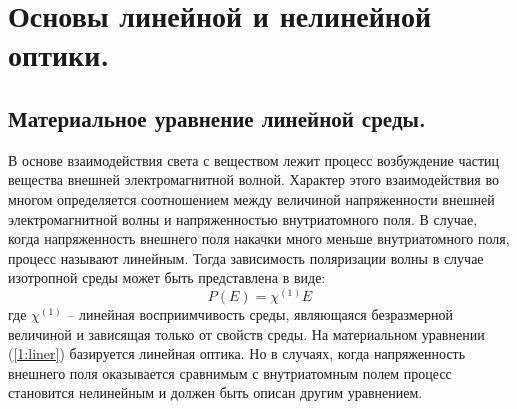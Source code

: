 \section{Основы линейной и нелинейной оптики.}

\subsection{Материальное уравнение линейной среды.}
\hspace*{2mm}
В основе взаимодействия света с веществом лежит процесс возбуждение частиц вещества внешней электромагнитной волной. Характер этого взаимодействия во многом определяется соотношением между величиной напряженности внешней электромагнитной волны и напряженностью внутриатомного поля. В случае, когда напряженность внешнего поля накачки много меньше внутриатомного поля, процесс называют линейным. Тогда зависимость поляризации волны в случае изотропной среды может быть представлена в виде:
\begin{equation}\label{1:liner}
P(E) = \chi^{(1)}E
\end{equation}
где $ \chi^{(1)}$ – линейная восприимчивость среды, являющаяся безразмерной величиной и зависящая только от свойств среды. На материальном уравнении  (\ref{1:liner}) базируется линейная оптика.  Но в случаях, когда напряженность внешнего поля оказывается  сравнимым с внутриатомным полем процесс становится нелинейным и должен быть описан другим уравнением. 


